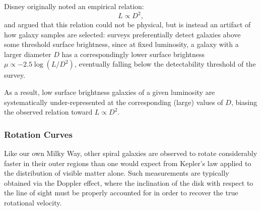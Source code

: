 \begin{minipage}{0.47\textwidth}
    Disney originally noted an empirical relation:
    $$
    L \propto D^2,
    $$
    and argued that this relation could not be physical, but is instead an artifact of how galaxy samples are selected: surveys preferentially detect galaxies above some threshold surface brightness, since at fixed luminosity, a galaxy with a larger diameter $D$ has a correspondingly lower surface brightness $\mu \propto -2.5\log(L/D^2)$, eventually falling below the detectability threshold of the survey.
\end{minipage}%
\hfill
\begin{minipage}{0.5\textwidth}
    \centering
    \vspace{-0.3em}

\end{minipage}

\smallskip

As a result, low surface brightness galaxies of a given luminosity are systematically under-represented at the corresponding (large) values of $D$, biasing the observed relation toward $L \propto D^2$.

\subsubsection{Rotation Curves}

Like our own Milky Way, other spiral galaxies are observed to rotate considerably faster in their outer regions than one would expect from Kepler's law applied to the distribution of visible matter alone. Such measurements are typically obtained via the Doppler effect, where the inclination of the disk with respect to the line of sight must be properly accounted for in order to recover the true rotational velocity.

